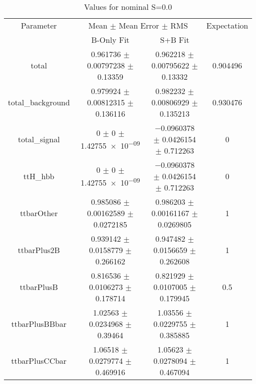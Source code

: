 \begin{table}
\centering
\caption{Values for nominal S=0.0}
\begin{tabular}{cccc}
\toprule
Parameter & \multicolumn{2}{c}{Mean $\pm$ Mean Error $\pm$ RMS} & Expectation\\
 & B-Only Fit & S+B Fit & \\
\midrule
total & \num{0.961736} $\pm$ \num{0.00797238} $\pm$ \num{0.13359} & \num{0.962218} $\pm$ \num{0.00795622} $\pm$ \num{0.13332} & \num{0.904496}\\
total\_background & \num{0.979924} $\pm$ \num{0.00812315} $\pm$ \num{0.136116} & \num{0.982232} $\pm$ \num{0.00806929} $\pm$ \num{0.135213} & \num{0.930476}\\
total\_signal & \num{0} $\pm$ \num{0} $\pm$ \num{1.42755e-09} & \num{-0.0960378} $\pm$ \num{0.0426154} $\pm$ \num{0.712263} & \num{0}\\
ttH\_hbb & \num{0} $\pm$ \num{0} $\pm$ \num{1.42755e-09} & \num{-0.0960378} $\pm$ \num{0.0426154} $\pm$ \num{0.712263} & \num{0}\\
ttbarOther & \num{0.985086} $\pm$ \num{0.00162589} $\pm$ \num{0.0272185} & \num{0.986203} $\pm$ \num{0.00161167} $\pm$ \num{0.0269805} & \num{1}\\
ttbarPlus2B & \num{0.939142} $\pm$ \num{0.0158779} $\pm$ \num{0.266162} & \num{0.947482} $\pm$ \num{0.0156659} $\pm$ \num{0.262608} & \num{1}\\
ttbarPlusB & \num{0.816536} $\pm$ \num{0.0106273} $\pm$ \num{0.178714} & \num{0.821929} $\pm$ \num{0.0107005} $\pm$ \num{0.179945} & \num{0.5}\\
ttbarPlusBBbar & \num{1.02563} $\pm$ \num{0.0234968} $\pm$ \num{0.39464} & \num{1.03556} $\pm$ \num{0.0229755} $\pm$ \num{0.385885} & \num{1}\\
ttbarPlusCCbar & \num{1.06518} $\pm$ \num{0.0279774} $\pm$ \num{0.469916} & \num{1.05623} $\pm$ \num{0.0278094} $\pm$ \num{0.467094} & \num{1}\\
\bottomrule
\end{tabular}
\end{table}